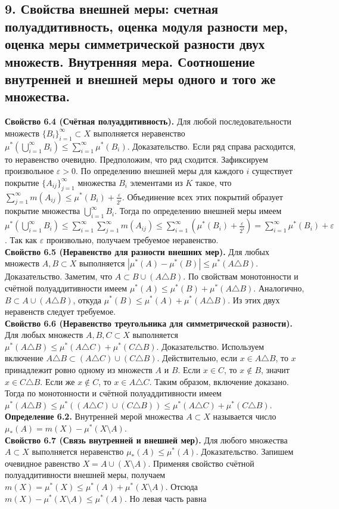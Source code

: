\documentclass[12pt]{article}
\begin{document}
\subsection*{9. Свойства внешней меры: счетная полуаддитивность, оценка модуля разности мер,
оценка меры симметрической разности двух множеств. Внутренняя мера.
Соотношение внутренней и внешней меры одного и того же множества.}
\textbf{Свойство 6.4 (Счётная полуаддитивность).} Для любой последовательности множеств $\{B_i\}_{i=1}^\infty \subset X$ выполняется неравенство $\mu^{*}(\bigcup_{i=1}^\infty B_i) \leq \sum_{i=1}^\infty \mu^{*}(B_i)$. Доказательство. Если ряд справа расходится, то неравенство очевидно. Предположим, что ряд сходится. Зафиксируем произвольное $\varepsilon > 0$. По определению внешней меры для каждого $i$ существует покрытие $\{A_{ij}\}_{j=1}^\infty$ множества $B_i$ элементами из $K$ такое, что $\sum_{j=1}^\infty m(A_{ij}) \leq \mu^{*}(B_i) + \frac{\varepsilon}{2^i}$. Объединение всех этих покрытий образует покрытие множества $\bigcup_{i=1}^\infty B_i$. Тогда по определению внешней меры имеем $\mu^{*}(\bigcup_{i=1}^\infty B_i) \leq \sum_{i=1}^\infty \sum_{j=1}^\infty m(A_{ij}) \leq \sum_{i=1}^\infty (\mu^{*}(B_i) + \frac{\varepsilon}{2^i}) = \sum_{i=1}^\infty \mu^{*}(B_i) + \varepsilon$. Так как $\varepsilon$ произвольно, получаем требуемое неравенство. \\\textbf{Свойство 6.5 (Неравенство для разности внешних мер).} Для любых множеств $A, B \subset X$ выполняется $|\mu^{*}(A) - \mu^{*}(B)| \leq \mu^{*}(A \triangle B)$. Доказательство. Заметим, что $A \subset B \cup (A \triangle B)$. По свойствам монотонности и счётной полуаддитивности имеем $\mu^{*}(A) \leq \mu^{*}(B) + \mu^{*}(A \triangle B)$. Аналогично, $B \subset A \cup (A \triangle B)$, откуда $\mu^{*}(B) \leq \mu^{*}(A) + \mu^{*}(A \triangle B)$. Из этих двух неравенств следует требуемое. \\\textbf{Свойство 6.6 (Неравенство треугольника для симметрической разности).} Для любых множеств $A, B, C \subset X$ выполняется $\mu^{*}(A \triangle B) \leq \mu^{*}(A \triangle C) + \mu^{*}(C \triangle B)$. Доказательство. Используем включение $A \triangle B \subset (A \triangle C) \cup (C \triangle B)$. Действительно, если $x \in A \triangle B$, то $x$ принадлежит ровно одному из множеств $A$ и $B$. Если $x \in C$, то $x \notin B$, значит $x \in C \triangle B$. Если же $x \notin C$, то $x \in A \triangle C$. Таким образом, включение доказано. Тогда по монотонности и счётной полуаддитивности имеем $\mu^{*}(A \triangle B) \leq \mu^{*}((A \triangle C) \cup (C \triangle B)) \leq \mu^{*}(A \triangle C) + \mu^{*}(C \triangle B)$. \\\textbf{Определение 6.2.} Внутренней мерой множества $A \subset X$ называется число $\mu_{*}(A) = m(X) - \mu^{*}(X \setminus A)$. \\\textbf{Свойство 6.7 (Связь внутренней и внешней мер).} Для любого множества $A \subset X$ выполняется неравенство $\mu_{*}(A) \leq \mu^{*}(A)$. Доказательство. Запишем очевидное равенство $X = A \cup (X \setminus A)$. Применяя свойство счётной полуаддитивности внешней меры, получаем $m(X) = \mu^{*}(X) \leq \mu^{*}(A) + \mu^{*}(X \setminus A)$. Отсюда $m(X) - \mu^{*}(X \setminus A) \leq \mu^{*}(A)$. Но левая часть равна 
\end{document}
